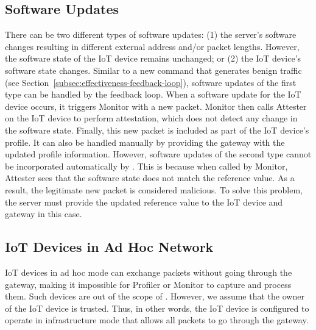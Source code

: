 \subsection{Software Updates} 
There can be two different types of software updates: (1) the server's software changes resulting in different external address and/or packet lengths. However, the software state of the IoT device remains unchanged; or (2) the IoT device's software state changes.
Similar to a new command that generates benign traffic (see Section~\ref{subsec:effectiveness-feedback-loop}), software updates of the first type can be handled by the feedback loop. 
When a software update for the IoT device occurs, it triggers Monitor with a new packet. Monitor then calls Attester on the IoT device to perform attestation, which does not detect any change in the software state. Finally, this new packet is included as part of the IoT device's profile. It can also be handled manually by providing the gateway with the updated profile information. 
However, software updates of the second type cannot be incorporated automatically by \system{}. This is because when called by Monitor, Attester sees that the software state does not match the reference value. As a result, the legitimate new packet is considered malicious. To solve this problem, the server must provide the updated reference value to the IoT device and gateway in this case.

\subsection{IoT Devices in Ad Hoc Network}
IoT devices in ad hoc mode can exchange packets without going through the gateway, making it impossible for Profiler or Monitor to capture and process them. Such devices are out of the scope of \system{}. However, we assume that the owner of the IoT device is trusted. Thus, in other words, the IoT device is configured to operate in infrastructure mode that allows all packets to go through the gateway.  